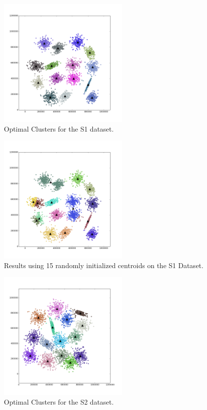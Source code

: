 \documentclass[journal]{IEEEtran}
\begin{document}
\begin{figure}[!t]
\centering
\includegraphics[width=2.5in]{../figs/s1_true_euclid_15.png}
\caption{Optimal Clusters for the S1 dataset.}
\label{fig_sim}
\end{figure}

\begin{figure}[!t]
	\centering
	\includegraphics[width=2.5in]{../figs/s1_rand_euclid_15.png}
	\caption{Results using 15 randomly initialized centroids on the S1 Dataset.}
	\label{fig_sim}
\end{figure}

\begin{figure}[!t]
	\centering
	\includegraphics[width=2.5in]{../figs/s2_true_euclid_15.png}
	\caption{Optimal Clusters for the S2 dataset.}
	\label{fig_sim}
\end{figure}
\end{document}
